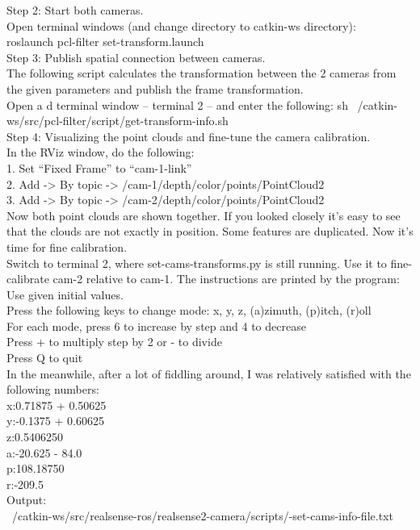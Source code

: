    
Step 2: Start both cameras.\\
Open terminal windows (and change directory to catkin-ws directory)$\colon$\\
roslaunch pcl-filter set-transform.launch\\


Step 3: Publish spatial connection between cameras.\\
The following script calculates the transformation between the 2 cameras from the given parameters and publish the frame transformation.\\
Open a d terminal window – terminal 2 – and enter the following: sh ~/catkin-ws/src/pcl-filter/script/get-transform-info.sh\\


Step 4: Visualizing the point clouds and fine-tune the camera calibration.\\

In the RViz window, do the following:\\

1. Set “Fixed Frame” to “cam-1-link”\\
2. Add -> By topic -> /cam-1/depth/color/points/PointCloud2\\
3. Add -> By topic -> /cam-2/depth/color/points/PointCloud2\\
Now both point clouds are shown together. If you looked closely it’s easy to see that the clouds are not exactly in position. Some features are duplicated. Now it’s time for fine calibration.\\

Switch to terminal 2, where set-cams-transforms.py is still running. Use it to fine-calibrate cam-2 relative to cam-1. The instructions are printed by the program:\\

Use given initial values.\\
Press the following keys to change mode: x, y, z, (a)zimuth, (p)itch, (r)oll\\
For each mode, press 6 to increase by step and 4 to decrease\\
Press + to multiply step by 2 or - to divide\\
Press Q to quit\\
In the meanwhile, after a lot of fiddling around, I was relatively satisfied with the following numbers:\\
x:0.71875 + 0.50625\\
y:-0.1375 + 0.60625\\
z:0.5406250\\
a:-20.625 - 84.0\\
p:108.18750\\
r:-209.5\\
Output:\\
   ~/catkin-ws/src/realsense-ros/realsense2-camera/scripts/-set-cams-info-file.txt\\
   
